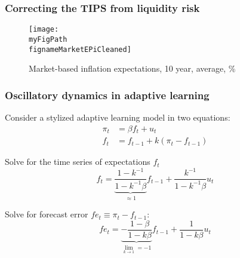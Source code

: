 \documentclass[11pt]{beamer}
\def \myFigPath {../../../figures/}
\def\fignameMarketEPiCleaned{cleaned_epi10_2020_07_28}
\begin{document}
\begin{frame}[plain]  %
\frametitle{Correcting the TIPS from liquidity risk}
	\label{app_TIPS}

\begin{figure}[h!]
\texttt{[image: \\myFigPath \\fignameMarketEPiCleaned]} %
\caption{Market-based inflation expectations, 10 year, average, \%}
\label{epi_cleaned}
\end{figure}

\vfill 
\hyperlink{motivation}{}	

\end{frame}

\begin{frame}[plain]  %
\frametitle{Oscillatory dynamics in adaptive learning}
	\label{oscillatory}

Consider a stylized adaptive learning model in two equations:
\begin{align}
\pi_t & = \beta f_t + u_t  \\
f_t & = f_{t-1} + k(\pi_t - f_{t-1}) 
\end{align}

Solve for the time series of expectations $f_t$
\begin{equation}
f_t = \underbrace{\frac{1-k^{-1}}{1-k^{-1}\beta}}_{\approx 1}f_{t-1} + \frac{k^{-1}}{1-k^{-1}\beta}u_t
\end{equation}

Solve for forecast error $fe_t \equiv \pi_t - f_{t-1}$:
\begin{equation}
fe_t = \underbrace{-\frac{1-\beta}{1-k\beta}}_{\lim_{k \to 1} = -1}f_{t-1} + \frac{1}{1-k\beta}u_t 
\end{equation}

\end{frame}
\end{document}
